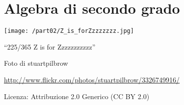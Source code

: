 \part{Algebra di secondo grado}
\texttt{[image: /part02/Z\_is\_forZzzzzzzz.jpg]}
 \begin{center}
 {\large ``225/365 Z is for Zzzzzzzzzzz''}\par
 Foto di stuartpilbrow\par
 \url{http://www.flickr.com/photos/stuartpilbrow/3326749916/}\par
 Licenza: Attribuzione 2.0 Generico (CC BY 2.0)\par
 \end{center}
\clearpage
\cleardoublepage
